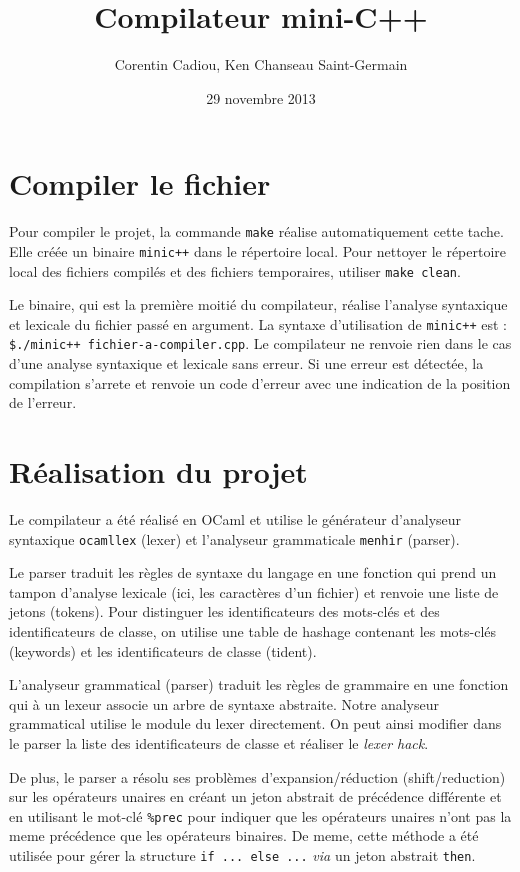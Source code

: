 \documentclass{article}
\title{Compilateur mini-C++}
\author{Corentin Cadiou, Ken Chanseau Saint-Germain}
\date{29 novembre 2013}
\begin{document}
\maketitle
\section*{Compiler le fichier}
Pour compiler le projet, la commande \texttt{make} réalise
automatiquement cette tache. Elle créée un binaire \texttt{minic++}
dans le répertoire local. Pour nettoyer le répertoire local des
fichiers compilés et des fichiers temporaires, utiliser \texttt{make clean}.

Le binaire, qui est la première moitié du compilateur, réalise
l'analyse syntaxique et lexicale du fichier passé en argument. La
syntaxe d'utilisation de \texttt{minic++} est : \texttt{\$./minic++
  fichier-a-compiler.cpp}. Le compilateur ne renvoie rien dans le cas
d'une analyse syntaxique et lexicale sans erreur. Si une erreur est
détectée, la compilation s'arrete et renvoie un code d'erreur avec une
indication de la position de l'erreur.
\section*{Réalisation du projet}
Le compilateur a été réalisé en OCaml et utilise le générateur
d'analyseur syntaxique \texttt{ocamllex} (lexer) et l'analyseur grammaticale
\texttt{menhir} (parser).

Le parser traduit les règles de syntaxe du langage en une fonction
qui prend un tampon d'analyse lexicale (ici, les caractères d'un
fichier) et renvoie une liste de jetons (tokens). Pour distinguer les
identificateurs des mots-clés et des identificateurs de classe, on
utilise une table de hashage contenant les mots-clés (keywords) et les
identificateurs de classe (tident).

L'analyseur grammatical (parser) traduit les règles de grammaire en
une fonction qui à un lexeur associe un arbre de syntaxe
abstraite. Notre analyseur grammatical utilise le module du lexer
directement. On peut ainsi modifier dans le parser la liste
des identificateurs de classe et réaliser le \emph{lexer hack}.

De plus, le parser a résolu ses problèmes d'expansion/réduction
(shift/reduction) sur les opérateurs unaires en créant un jeton
abstrait de précédence différente et en utilisant le mot-clé
\texttt{\%prec} pour indiquer que les opérateurs unaires n'ont pas la
meme précédence que les opérateurs binaires. De meme, cette méthode a
été utilisée pour gérer la structure \texttt{if ... else ...}
\emph{via} un jeton abstrait \texttt{then}.
\pagebreak
\end{document}
